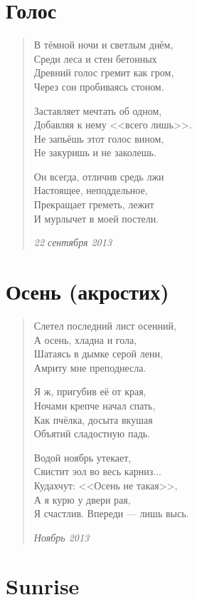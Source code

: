 \section{Голос}

\begin{verse}
В тёмной ночи и светлым днём,\\
Среди леса и стен бетонных\\
Древний голос гремит как гром,\\
Через сон пробиваясь стоном.

Заставляет мечтать об одном,\\
Добавляя к нему <<всего лишь>>.\\
Не запьёшь этот голос вином,\\
Не закуришь и не заколешь.

Он всегда, отличив средь лжи\\
Настоящее, неподдельное,\\
Прекращает греметь, лежит\\
И мурлычет в моей постели.

\emph{22 сентября 2013}
\end{verse}
\newpage

\section{Осень (акростих)}

\begin{verse}
Слетел последний лист осенний,\\
А осень, хладна и гола,\\
Шатаясь в дымке серой лени,\\
Амриту мне преподнесла.

Я ж, пригубив её от края,\\
Ночами крепче начал спать,\\
Как пчёлка, досыта вкушая\\
Объятий сладостную падь.

Водой ноябрь утекает,\\
Свистит эол во весь карниз...\\
Кудахчут: <<Осень не такая>>,\\
А я курю у двери рая,\\
Я счастлив. Впереди --- лишь высь.

\emph{Ноябрь 2013}
\end{verse}
\newpage

\section{Sunrise}

